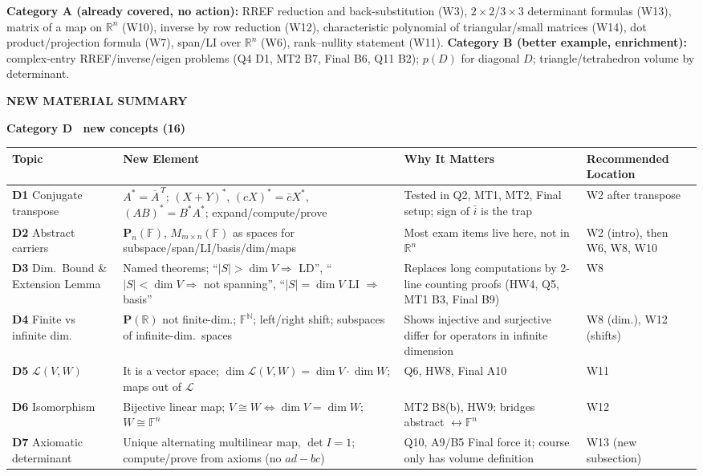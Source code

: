 \documentclass[9pt]{article}
\newcommand{\secn}[1]{\vspace{5pt}\par\noindent\begin{tcolorbox}[colback=NAVY,colframe=NAVY,boxrule=0pt,arc=2pt,left=5pt,top=1pt,bottom=1pt]\color{white}\bfseries\MakeUppercase{#1}\end{tcolorbox}\nopagebreak}
\newcommand{\sub}[1]{\vspace{3pt}\par{\bfseries\color{NAVY}#1}\nopagebreak\par}
\begin{document}
\textbf{Category A (already covered, no action):} RREF reduction and back-substitution (W3), $2\times2$/$3\times3$ determinant formulas (W13), matrix of a map on $\mathbb R^n$ (W10), inverse by row reduction (W12), characteristic polynomial of triangular/small matrices (W14), dot product/projection formula (W7), span/LI over $\mathbb R^n$ (W6), rank--nullity statement (W11). \textbf{Category B (better example, enrichment):} complex-entry RREF/inverse/eigen problems (Q4 D1, MT2 B7, Final B6, Q11 B2); $p(D)$ for diagonal $D$; triangle/tetrahedron volume by determinant.
\secn{New Material Summary}
\sub{Category D \textemdash\ new concepts (16)}
{\footnotesize
\begin{longtable}{@{}p{2.6cm}p{5.6cm}p{4.6cm}p{3.6cm}@{}}
\toprule \textbf{Topic} & \textbf{New Element} & \textbf{Why It Matters} & \textbf{Recommended Location}\\\midrule\endhead
\textbf{D1} Conjugate transpose & $A^*=\overline{A}^{\,T}$; $(X{+}Y)^*$, $(cX)^*=\bar cX^*$, $(AB)^*=B^*A^*$; expand/compute/prove & Tested in Q2, MT1, MT2, Final setup; sign of $\bar i$ is the trap & W2 after transpose\\
\textbf{D2} Abstract carriers & $\mathbf P_n(\mathbb F)$, $M_{m\times n}(\mathbb F)$ as spaces for subspace/span/LI/basis/dim/maps & Most exam items live here, not in $\mathbb R^n$ & W2 (intro), then W6, W8, W10\\
\textbf{D3} Dim.\ Bound \& Extension Lemma & Named theorems; ``$|S|>\dim V\Rightarrow$ LD'', ``$|S|<\dim V\Rightarrow$ not spanning'', ``$|S|=\dim V$ LI $\Rightarrow$ basis'' & Replaces long computations by 2-line counting proofs (HW4, Q5, MT1 B3, Final B9) & W8\\
\textbf{D4} Finite vs infinite dim. & $\mathbf P(\mathbb R)$ not finite-dim.; $\mathbb F^{\mathbb N}$; left/right shift; subspaces of infinite-dim.\ spaces & Shows injective and surjective differ for operators in infinite dimension & W8 (dim.), W12 (shifts)\\
\textbf{D5} $\mathcal L(V,W)$ & It is a vector space; $\dim\mathcal L(V,W)=\dim V\cdot\dim W$; maps out of $\mathcal L$ & Q6, HW8, Final A10 & W11\\
\textbf{D6} Isomorphism & Bijective linear map; $V\cong W\iff\dim V=\dim W$; $W\cong\mathbb F^n$ & MT2 B8(b), HW9; bridges abstract $\leftrightarrow\mathbb F^n$ & W12\\
\textbf{D7} Axiomatic determinant & Unique alternating multilinear map, $\det I=1$; compute/prove from axioms (no $ad-bc$) & Q10, A9/B5 Final force it; course only has volume definition & W13 (new subsection)\\

\end{longtable}}
\end{document}
